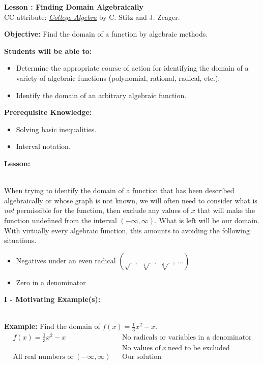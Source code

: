 \documentclass[12pt]{article}
\theoremstyle{definition}
\begin{document}
{\bf \large Lesson : Finding Domain Algebraically}
\\ CC attribute: \href{http://www.stitz-zeager.com}{\it{College Algebra}} by C. Stitz and J. Zeager. 
\hfill \doclicenseImage[imagewidth=5em]\\
\par
{\bf Objective:} Find the domain of a function by algebraic methods.\\
\par
{\bf Students will be able to:}
\begin{itemize}
	\item Determine the appropriate course of action for identifying the domain of a variety of algebraic functions (polynomial, rational, radical, etc.).
	\item Identify the domain of an arbitrary algebraic function.
\end{itemize}
{\bf Prerequisite Knowledge:}
\begin{itemize}
	\item Solving basic inequalities.
	\item Interval notation.
\end{itemize}
\hrulefill

{\bf Lesson:}\\
\ \par
When trying to identify the domain of a function that has been described algebraically or whose graph is not known, we will often need to consider what is {\it not} permissible for the function, then exclude any values of $x$ that will make the function undefined from the interval $(-\infty,\infty)$.  What is left will be our domain.  With virtually every algebraic function, this amounts to avoiding the following situations.
\begin{itemize}
	\item Negatives under an even radical $\left(\sqrt{~}~,~~\sqrt[4]{~}~,~~\sqrt[6]{~}~,~\ldots\right)$
	\item Zero in a denominator
\end{itemize}
{\bf I - Motivating Example(s):}\\
\ \par
{\bf Example:} Find the domain of $f(x)=\frac{1}{3} x^2-x$.
  \begin{eqnarray*}
    f (x) = \frac{1}{3} x^2 - x & & \text{No radicals or variables in a denominator}\\
		& & \text{No values of} \ x \ \text{need to be excluded}\\
		\text{All real numbers or} \ (-\infty,\infty) & & \text{Our solution}
 \end{eqnarray*}
\end{document}

